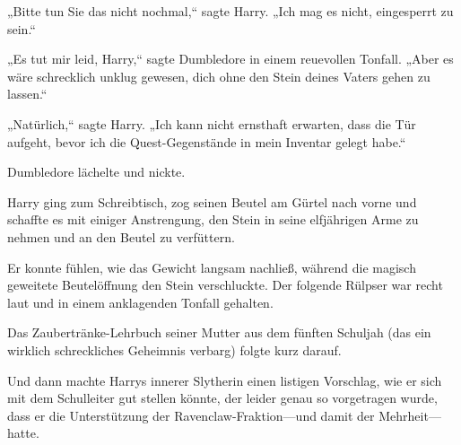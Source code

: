 „Bitte tun Sie das nicht nochmal,“ sagte Harry. „Ich mag es nicht, eingesperrt zu sein.“

„Es tut mir leid, Harry,“ sagte Dumbledore in einem reuevollen Tonfall. „Aber es wäre schrecklich unklug gewesen, dich ohne den Stein deines Vaters gehen zu lassen.“

„Natürlich,“ sagte Harry. „Ich kann nicht ernsthaft erwarten, dass die Tür aufgeht, bevor ich die Quest-Gegenstände in mein Inventar gelegt habe.“

Dumbledore lächelte und nickte.

Harry ging zum Schreibtisch, zog seinen Beutel am Gürtel nach vorne und schaffte es mit einiger Anstrengung, den Stein in seine elfjährigen Arme zu nehmen und an den Beutel zu verfüttern.

Er konnte fühlen, wie das Gewicht langsam nachließ, während die magisch geweitete Beutelöffnung den Stein verschluckte. Der folgende Rülpser war recht laut und in einem anklagenden Tonfall gehalten.

Das Zaubertränke-Lehrbuch seiner Mutter aus dem fünften Schuljah (das ein wirklich schreckliches Geheimnis verbarg) folgte kurz darauf.

Und dann machte Harrys innerer Slytherin einen listigen Vorschlag, wie er sich mit dem Schulleiter gut stellen könnte, der leider genau so vorgetragen wurde, dass er die Unterstützung der Ravenclaw-Fraktion—und damit der Mehrheit—hatte.

